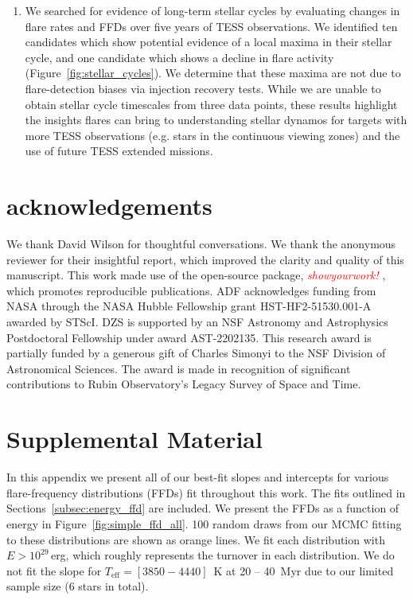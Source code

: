 \documentclass[twocolumn]{aastex631}
\begin{document}
\begin{enumerate}
  \item We searched for evidence of long-term stellar cycles by evaluating changes in flare rates and FFDs  over five years of TESS observations. We identified ten candidates which show potential evidence of a local maxima in their stellar cycle, and one candidate which shows a decline in flare activity (Figure~\ref{fig:stellar_cycles}). We determine that these maxima are not due to flare-detection biases via injection recovery tests. While we are unable to obtain stellar cycle timescales from three data points, these results highlight the insights flares can bring to understanding stellar dynamos for targets with more TESS observations (e.g. stars in the continuous viewing zones) and the use of future TESS extended missions.

\end{enumerate}


\vspace{3mm}



\section{acknowledgements}

We thank David Wilson for thoughtful conversations. We thank the anonymous reviewer for their insightful report,
which improved the clarity and quality of this manuscript. This work made use of the open-source package,
\textcolor{red}{\textit{showyourwork!}} \citep{luger2021}, which promotes reproducible publications. ADF acknowledges funding from
NASA through the NASA Hubble Fellowship grant HST-HF2-51530.001-A awarded by STScI. DZS is supported by an NSF Astronomy and Astrophysics
Postdoctoral Fellowship under award AST-2202135. This research award is partially funded by a generous gift of Charles Simonyi to the NSF
Division of Astronomical Sciences. The award is made in recognition of significant contributions to Rubin Observatory’s Legacy Survey of Space and Time.



\appendix
\restartappendixnumbering

\section{Supplemental Material}\label{appendix:supp_ffds}

In this appendix we present all of our best-fit slopes and intercepts for various flare-frequency distributions (FFDs) fit throughout this work. The fits outlined in Sections~\ref{subsec:energy_ffd} are included. We present the FFDs as a function of energy in Figure~\ref{fig:simple_ffd_all}.  100 random draws from our MCMC fitting to these distributions are shown as orange lines. We fit each distribution with $E > 10^{29}$\,erg, which roughly represents the turnover in each distribution. We do not fit the slope for $T_\textrm{eff} = [3850 - 4440]$~K at 20 -- 40~Myr due to our limited sample size (6 stars in total).
\end{document}

